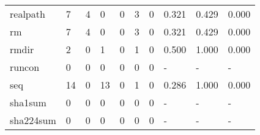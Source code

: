\begin{longtable}{lp{1.3cm}p{1.3cm}p{1.3cm}p{1.3cm}p{1.3cm}p{1.3cm}p{1.3cm}p{1.3cm}p{1.3cm}}
realpath  &                      7 &                                  4 &                                 0 &                                0 &                                 3 &                               0 &                                0.321 &                                  0.429 &                                0.000 \\
rm        &                      7 &                                  4 &                                 0 &                                0 &                                 3 &                               0 &                                0.321 &                                  0.429 &                                0.000 \\
rmdir     &                      2 &                                  0 &                                 1 &                                0 &                                 1 &                               0 &                                0.500 &                                  1.000 &                                0.000 \\
runcon    &                      0 &                                  0 &                                 0 &                                0 &                                 0 &                               0 &                                    - &                                      - &                                    - \\
seq       &                     14 &                                  0 &                                13 &                                0 &                                 1 &                               0 &                                0.286 &                                  1.000 &                                0.000 \\
sha1sum   &                      0 &                                  0 &                                 0 &                                0 &                                 0 &                               0 &                                    - &                                      - &                                    - \\
sha224sum &                      0 &                                  0 &                                 0 &                                0 &                                 0 &                               0 &                                    - &                                      - &                                    - \\

\end{longtable}
